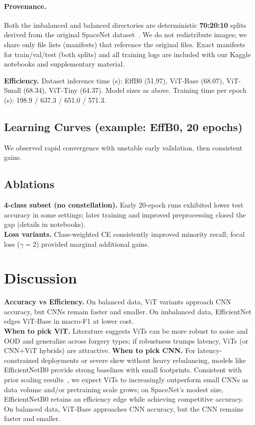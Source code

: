\FloatBarrier


\paragraph{Provenance.}
Both the imbalanced and balanced directories are deterministic \textbf{70:20:10} splits
derived from the original SpaceNet dataset~\cite{SpaceNetKaggle}.
We do not redistribute images; we share only file lists (manifests) that reference the
original files. Exact manifests for train/val/test (both splits) and all training logs
are included with our Kaggle notebooks and supplementary material.

\noindent\textbf{Efficiency.} Dataset inference time (s): EffB0 (51.97), ViT-Base (68.07), ViT-Small (68.34), ViT-Tiny (64.37). Model sizes as above. Training time per epoch (s): 198.9 / 637.3 / 651.0 / 571.3.

\subsection{Learning Curves (example: EffB0, 20 epochs)}
We observed rapid convergence with unstable early validation, then consistent gains.

\subsection{Ablations}
\textbf{4-class subset (no constellation).} Early 20-epoch runs exhibited lower test accuracy in some settings; later training and improved preprocessing closed the gap (details in notebooks). \\
\textbf{Loss variants.} Class-weighted CE consistently improved minority recall; focal loss ($\gamma{=}2$) provided marginal additional gains.



\section{Discussion}
\textbf{Accuracy vs Efficiency.} On balanced data, ViT variants approach CNN accuracy, but CNNs remain faster and smaller. On imbalanced data, EfficientNet edges ViT-Base in macro-F1 at lower cost. \\
\textbf{When to pick ViT.} Literature suggests ViTs can be more robust to noise and OOD and generalize across forgery types; if robustness trumps latency, ViTs (or CNN+ViT hybrids) are attractive.
\textbf{When to pick CNN.} For latency-constrained deployments or severe skew without heavy rebalancing, models like EfficientNetB0 provide strong baselines with small footprints.
Consistent with prior scaling results~\cite{Dosovitskiy2020ViT}, we expect ViTs to increasingly outperform small CNNs as data volume and/or pretraining scale grows; on SpaceNet’s modest size, EfficientNetB0 retains an efficiency edge while achieving competitive accuracy.
On balanced data, ViT-Base approaches CNN accuracy, but the CNN remains faster and smaller.

